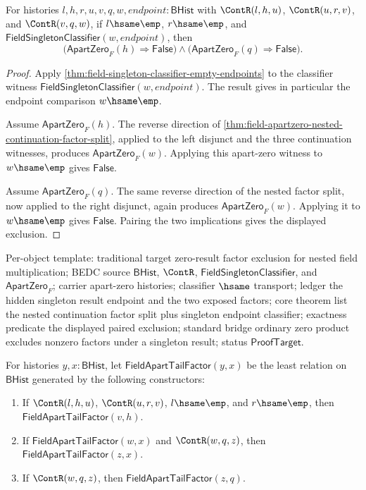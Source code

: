 \begin{theorem}
\label{thm:field-apartzero-nested-continuation-singleton-result-factor-absurd}
For histories $l,h,r,u,v,q,w,endpoint:\mathsf{BHist}$ with
$\ContR(l,h,u)$, $\ContR(u,r,v)$, and $\ContR(v,q,w)$, if
$l\hsame\emp$, $r\hsame\emp$, and
$\mathsf{FieldSingletonClassifier}(w,endpoint)$, then
$$
\bigl(\mathsf{ApartZero}_F(h)\Rightarrow\mathsf{False}\bigr)\land
\bigl(\mathsf{ApartZero}_F(q)\Rightarrow\mathsf{False}\bigr).
$$
\end{theorem}
\begin{proof}
Apply \autoref{thm:field-singleton-classifier-empty-endpoints} to the
classifier witness $\mathsf{FieldSingletonClassifier}(w,endpoint)$. The
result gives in particular the endpoint comparison $w\hsame\emp$.

Assume $\mathsf{ApartZero}_F(h)$. The reverse direction of
\autoref{thm:field-apartzero-nested-continuation-factor-split}, applied to
the left disjunct and the three continuation witnesses, produces
$\mathsf{ApartZero}_F(w)$. Applying this apart-zero witness to
$w\hsame\emp$ gives $\mathsf{False}$.

Assume $\mathsf{ApartZero}_F(q)$. The same reverse direction of the nested
factor split, now applied to the right disjunct, again produces
$\mathsf{ApartZero}_F(w)$. Applying it to $w\hsame\emp$ gives
$\mathsf{False}$. Pairing the two implications gives the displayed
exclusion.
\end{proof}

Per-object template: traditional target zero-result factor exclusion for
nested field multiplication; BEDC source $\mathsf{BHist}$, $\ContR$,
$\mathsf{FieldSingletonClassifier}$, and $\mathsf{ApartZero}_F$; carrier
apart-zero histories; classifier $\hsame$ transport; ledger the hidden
singleton result endpoint and the two exposed factors; core theorem list
the nested continuation factor split plus singleton endpoint classifier;
exactness predicate the displayed paired exclusion; standard bridge ordinary
zero product excludes nonzero factors under a singleton result; status
$\mathsf{ProofTarget}$.

\begin{definition}
\label{def:field-apartzero-tail-factor-spine}
For histories $y,x:\mathsf{BHist}$, let
$\mathsf{FieldApartTailFactor}(y,x)$ be the least relation on
$\mathsf{BHist}$ generated by the following constructors:
\begin{enumerate}
\item If $\ContR(l,h,u)$, $\ContR(u,r,v)$, $l\hsame\emp$, and
$r\hsame\emp$, then $\mathsf{FieldApartTailFactor}(v,h)$.
\item If $\mathsf{FieldApartTailFactor}(w,x)$ and $\ContR(w,q,z)$, then
$\mathsf{FieldApartTailFactor}(z,x)$.
\item If $\ContR(w,q,z)$, then $\mathsf{FieldApartTailFactor}(z,q)$.
\end{enumerate}
\end{definition}

